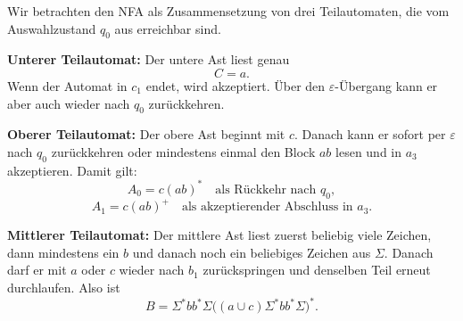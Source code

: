 \documentclass[a4paper,12pt]{article}
\begin{document}
\begin{center}
\end{center}

Wir betrachten den NFA als Zusammensetzung von drei Teilautomaten, die vom Auswahlzustand $q_0$ aus erreichbar sind.

\medskip
\textbf{Unterer Teilautomat:}
Der untere Ast liest genau
\[
C=a.
\]
Wenn der Automat in $c_1$ endet, wird akzeptiert. Über den $\varepsilon$-Übergang kann er aber auch wieder nach $q_0$ zurückkehren.

\medskip
\textbf{Oberer Teilautomat:}
Der obere Ast beginnt mit $c$. Danach kann er sofort per $\varepsilon$ nach $q_0$ zurückkehren oder mindestens einmal den Block $ab$ lesen und in $a_3$ akzeptieren. Damit gilt:
\[
A_0=c(ab)^*
\quad\text{als Rückkehr nach }q_0,
\]
\[
A_1=c(ab)^+
\quad\text{als akzeptierender Abschluss in }a_3.
\]

\medskip
\textbf{Mittlerer Teilautomat:}
Der mittlere Ast liest zuerst beliebig viele Zeichen, dann mindestens ein $b$ und danach noch ein beliebiges Zeichen aus $\Sigma$. Danach darf er mit $a$ oder $c$ wieder nach $b_1$ zurückspringen und denselben Teil erneut durchlaufen. Also ist
\[
B=\Sigma^*bb^*\Sigma\bigl((a\cup c)\Sigma^*bb^*\Sigma\bigr)^*.
\]
\end{document}
